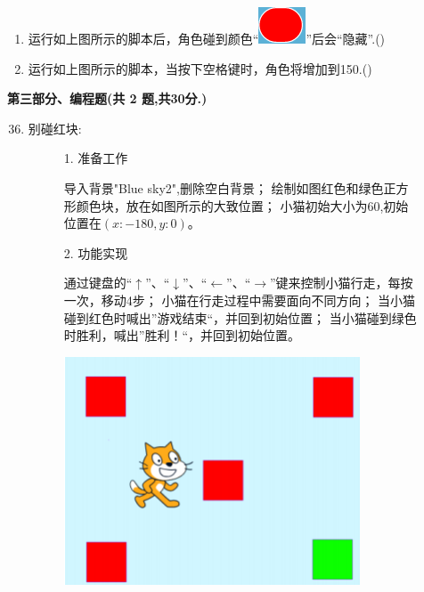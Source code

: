 \documentclass[10pt, a4paper]{article}
\begin{document}
\begin{enumerate}
        \item 运行如上图所示的脚本后，角色碰到颜色“\includegraphics[width=.03\textwidth]{34-2.png}”后会“隐藏”.(\qquad)
        
        \item 运行如上图所示的脚本，当按下空格键时，角色将增加到150.(\qquad)
    \end{enumerate}

    \newpage
    {\noindent \textbf{第三部分、编程题(共 2 题,共30分.)}}
    \begin{enumerate}
        \setcounter{enumi}{35}
        
        \item 别碰红块:
        \begin{figure}[htbp]
            \begin{minipage}{.6\textwidth}
                1. 准备工作
                \begin{tasks}[label = (\arabic*)]
                    \task 导入背景"Blue sky2",删除空白背景；
                    \task 绘制如图红色和绿色正方形颜色块，放在如图所示的大致位置；
                    \task 小猫初始大小为60,初始位置在$(x:-180,y:0)$。
                \end{tasks}
                2. 功能实现
                \begin{tasks}[label = (\arabic*)]
                    \task 通过键盘的“$\uparrow$”、“$\downarrow$”、“$\leftarrow$”、“$\to$”键来控制小猫行走，每按一次，移动4步；
                    \task 小猫在行走过程中需要面向不同方向；
                    \task 当小猫碰到红色时喊出”游戏结束“，并回到初始位置；
                    \task 当小猫碰到绿色时胜利，喊出”胜利！“，并回到初始位置。
                \end{tasks}
            \end{minipage}
            \begin{minipage}{.37\textwidth}
                \centering
                \includegraphics[width=\textwidth]{36.png}
            \end{minipage}
        \end{figure}


\end{enumerate}
\end{document}
